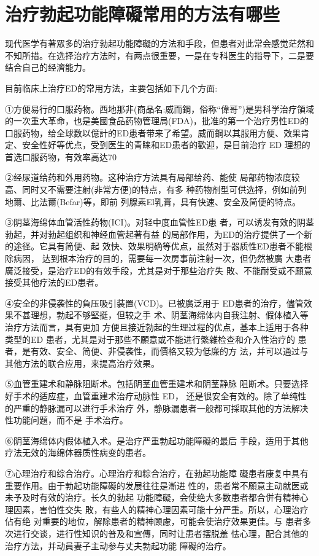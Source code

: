 \documentclass[12pt,UTF8]{ctexbook}
\begin{document}
\section{治疗勃起功能障礙常用的方法有哪些}

现代医学有著眾多的治疗勃起功能障礙的方法和手段，但患者对此常会感觉茫然和不知所措。在选择治疗方法时，有两点很重要，一是在专科医生的指导下，二是要结合自己的经濟能力。

目前临床上治疗ED的常用方法，主要包括如下几个方面:

①方便易行的口服药物。西地那非(商品名:威而鋼，俗称“偉哥”)是男科学治疗領域的一次重大革命，也是美國食品药物管理局(FDA)，批准的第一个治疗男性ED的口服药物，给全球数以億計的ED患者带来了希望。威而鋼以其服用方便、效果肯定、安全性好等优点，受到医生的青睐和ED患者的歡迎，是目前治疗 ED 理想的首选口服药物，有效率高达70%

②经尿道给药和外用药物。这种治疗方法具有局部给药、能使
局部药物浓度较高、同时又不需要注射(非常方便)的特点，有多
种药物剂型可供选择，例如前列地爾、比法爾(Befar)等，即前
列腺素El乳膏，具有快速、安全及简便的特点。

③阴茎海绵体血管活性药物(ICI)。对轻中度血管性ED患
者，可以诱发有效的阴茎勃起，并对勃起组织和神经血管起著有益
的局部作用，为ED的治疗提供了一个新的途径。它具有简便、起
效快、效果明确等优点，虽然对于器质性ED患者不能根除病因，
达到根本治疗的目的，需要每一次房事前注射一次，但仍然被廣
大患者廣泛接受，是治疗ED的有效手段，尤其是对于那些治疗失
敗、不能耐受或不願意接受其他疗法的ED患者。

④安全的非侵袭性的負压吸引装置(VCD)。已被廣泛用于
ED患者的治疗，儘管效果不甚理想，勃起不够堅挺，但较之手
术、阴茎海绵体内自我注射、假体植入等治疗方法而言，具有更加
方便且接近勃起的生理过程的优点，基本上适用于各种类型的ED
患者，尤其是对于那些不願意或不能进行繁雜检查和介入性治疗的
患者，是有效、安全、简便、非侵袭性，而價格又较为低廉的方
法，并可以通过与其他方法的联合应用，来提高治疗效果。

⑤血管重建术和静脉阻断术。包括阴茎血管重建术和阴茎静脉
阻断术。只要选择好手术的适应症，血管重建术治疗动脉性 ED，
还是很安全有效的。除了单纯性的严重的静脉漏可以进行手术治疗
外，静脉漏患者一般都可採取其他的方法解决性功能问題，而不是
手术治疗。

⑥阴茎海绵体内假体植入术。是治疗严重勃起功能障礙的最后
手段，适用于其他疗法无效的海绵体器质性病变的患者。

⑦心理治疗和综合治疗。心理治疗和粽合治疗，在勃起功能障
礙患者康复中具有重要作用。由于勃起功能障礙的发展往往是漸进
性的，患者常不願意主动就医或未予及时有效的治疗。长久的勃起
功能障礙，会使绝大多数患者都合併有精神心理因素，害怕性交失
敗，有些人的精神心理因素可能十分严重。所以，心理治疗佔有绝
对重要的地位，解除患者的精神顾慮，可能会使治疗效果更佳。与
患者多次进行交谈，进行性知识的普及和宣傳，同时让患者摆脱羞
怯心理，配合其他的治疗方法，并动員妻子主动参与丈夫勃起功能
障礙的治疗。
\end{document}
